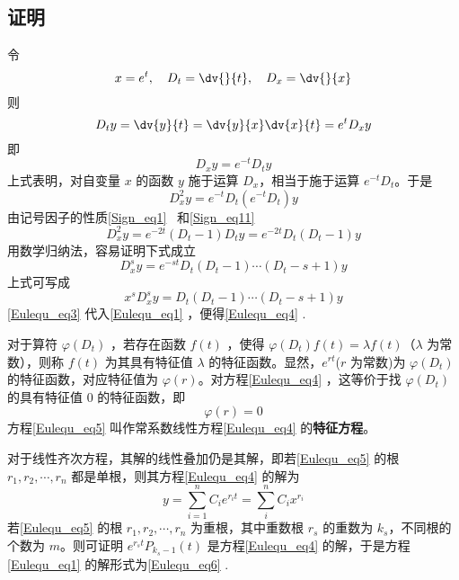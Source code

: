 \subsection{证明}
令
\begin{equation}
x=e^t,\quad D_t=\dv{}{t},\quad D_x=\dv{}{x}
\end{equation}
则
\begin{equation}
D_ty=\dv{y}{t}=\dv{y}{x}\dv{x}{t}=e^tD_xy
\end{equation}
即
\begin{equation}
D_xy=e^{-t}D_ty
\end{equation}
上式表明，对自变量 $x$ 的函数 $y$ 施于运算 $D_x$，相当于施于运算 $e^{-t}D_t$。于是
\begin{equation}
D_x^2y=e^{-t}D_t(e^{-t}D_t)y
\end{equation}
由记号因子的性质\autoref{Sign_eq1}~ 和\autoref{Sign_eq11}~
\begin{equation}
D_x^2y=e^{-2t}(D_t-1)D_ty=e^{-2t}D_t(D_t-1)y
\end{equation}
用数学归纳法，容易证明下式成立
\begin{equation}
D_x^sy=e^{-st}D_t(D_t-1)\cdots (D_t-s+1)y
\end{equation}
上式可写成
\begin{equation}\label{Eulequ_eq3}
x^sD_x^sy=D_t(D_t-1)\cdots (D_t-s+1)y
\end{equation}
\autoref{Eulequ_eq3} 代入\autoref{Eulequ_eq1} ，便得\autoref{Eulequ_eq4} .

对于算符 $\varphi(D_t)$ ，若存在函数 $f(t)$ ，使得
$\varphi(D_t)f(t)=\lambda f(t)$（$\lambda$ 为常数），则称 $f(t)$ 为其具有特征值 $\lambda$ 的特征函数。显然，$e^{rt}$($r$ 为常数)为 $\varphi(D_t)$ 的特征函数，对应特征值为 $\varphi(r)$。对方程\autoref{Eulequ_eq4} ，这等价于找 $\varphi(D_t)$ 的具有特征值 $0$ 的特征函数，即
\begin{equation}\label{Eulequ_eq5}
\varphi(r)=0
\end{equation}
方程\autoref{Eulequ_eq5} 叫作常系数线性方程\autoref{Eulequ_eq4} 的\textbf{特征方程}。

对于线性齐次方程，其解的线性叠加仍是其解，即若\autoref{Eulequ_eq5} 的根 $r_1,r_2,\cdots,r_n$ 都是单根，则其方程\autoref{Eulequ_eq4} 的解为
\begin{equation}
y=\sum_{i=1}^{n}C_ie^{r_it}=\sum_i^{n}C_ix^{r_i}
\end{equation}
 若\autoref{Eulequ_eq5} 的根 $r_1,r_2,\cdots,r_n$ 为重根，其中重数根 $r_s$ 的重数为 $k_s$，不同根的个数为 $m$。则可证明 $e^{r_st}P_{k_s-1}(t)$ 是方程\autoref{Eulequ_eq4} 的解，于是方程\autoref{Eulequ_eq1} 的解形式为\autoref{Eulequ_eq6} .
